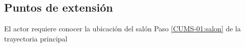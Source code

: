 \subsection{Puntos de extensión}
%
\UCExtensionPoint
{El actor requiere conocer la ubicación del salón}
{ Paso \ref{CUMS-01:salon} de la trayectoria principal}
{}

%
 